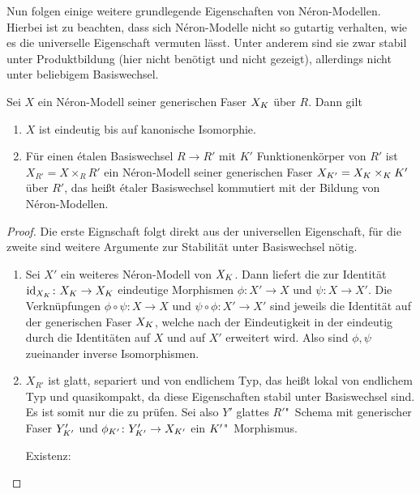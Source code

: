 Nun folgen einige weitere grundlegende Eigenschaften von
Néron-Modellen. Hierbei ist zu beachten, dass sich Néron-Modelle nicht
so gutartig verhalten, wie es die universelle Eigenschaft vermuten lässt.
Unter anderem sind sie zwar stabil unter Produktbildung (hier
nicht benötigt und nicht gezeigt), allerdings nicht unter
beliebigem Basiswechsel.
\begin{Satz}\label{thm:eigneronmodell}
  Sei $X$ ein Néron-Modell seiner generischen Faser $X_{K}$ über
  $R$. Dann gilt
  \begin{enumerate}[label=(\alph*)]
  \item $X$ ist eindeutig bis auf kanonische Isomorphie.
  \item Für einen étalen Basiswechsel $R\to R'$ mit $K'$
    Funktionenkörper von $R'$ ist $X_{R'}=X\times_R R'$ ein Néron-Modell
    seiner generischen Faser $X_{K'}=X_{K}\times_{K}K'$ über $R'$,
    das heißt étaler Basiswechsel kommutiert mit der Bildung von
    Néron-Modellen.
  \end{enumerate}
  \begin{proof}
    Die erste Eignschaft folgt direkt aus der universellen
    Eigenschaft, für die zweite sind weitere Argumente zur Stabilität
    unter Basiswechsel nötig. 
    \begin{enumerate}[resume*,start=1]
    \item Sei $X'$ ein weiteres Néron-Modell von $X_{K}$.
      Dann liefert die \NAbbEig zur Identität
      ${\mathrm{id}_{X_{K}}\colon X_{K}\to X_{K}}$ eindeutige Morphismen
      ${\phi\colon X'\to X}$ und ${\psi\colon X\to X'}$.
      Die Verknüpfungen ${\phi\circ\psi\colon X\to X}$ und
      ${\psi\circ\phi\colon X'\to X'}$ sind jeweils die Identität auf
      der generischen Faser $X_{K}$, welche nach der Eindeutigkeit in der
      \NAbbEig eindeutig durch die Identitäten auf
      $X$ und auf $X'$ erweitert wird. Also sind $\phi,\psi$
      zueinander inverse Isomorphismen.
    \item
      $X_{R'}$ ist glatt, separiert und von endlichem Typ, das heißt
      lokal von endlichem Typ und quasikompakt, da diese Eigenschaften
      stabil unter Basiswechsel sind. Es ist somit nur die
      \NAbbEig zu prüfen.
      Sei also $Y'$ glattes $R'$"~Schema mit generischer Faser
      $Y_{K'}'$ und ${\phi_{K'}\colon Y_{K'}'\to X_{K'}}$ ein
      $K'$"~Morphismus. 
      \begin{description}
      \item[Existenz:] 

\end{description}
\end{enumerate}
\end{proof}
\end{Satz}
